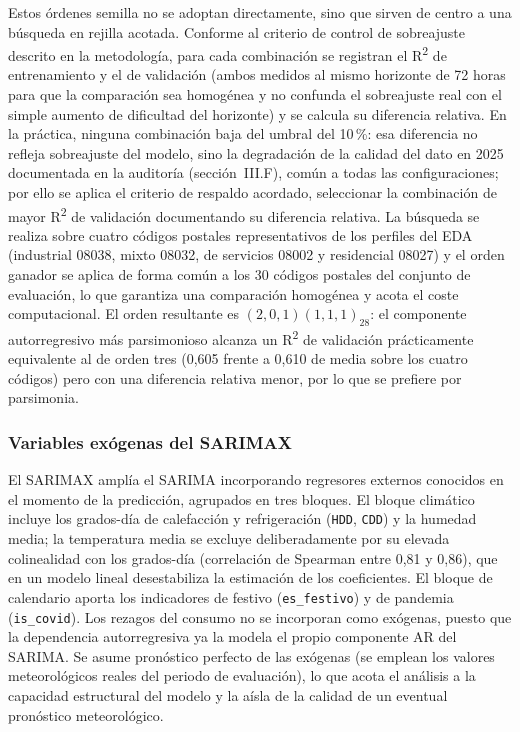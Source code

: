 \documentclass[12pt, a4paper]{article}
\begin{document}
Estos órdenes semilla no se adoptan directamente, sino que sirven de centro a una búsqueda en rejilla acotada. Conforme al criterio de control de sobreajuste descrito en la metodología, para cada combinación se registran el R\textsuperscript{2} de entrenamiento y el de validación (ambos medidos al mismo horizonte de 72 horas para que la comparación sea homogénea y no confunda el sobreajuste real con el simple aumento de dificultad del horizonte) y se calcula su diferencia relativa. En la práctica, ninguna combinación baja del umbral del 10\,\%: esa diferencia no refleja sobreajuste del modelo, sino la degradación de la calidad del dato en 2025 documentada en la auditoría (sección~III.F), común a todas las configuraciones; por ello se aplica el criterio de respaldo acordado, seleccionar la combinación de mayor R\textsuperscript{2} de validación documentando su diferencia relativa. La búsqueda se realiza sobre cuatro códigos postales representativos de los perfiles del EDA (industrial 08038, mixto 08032, de servicios 08002 y residencial 08027) y el orden ganador se aplica de forma común a los 30 códigos postales del conjunto de evaluación, lo que garantiza una comparación homogénea y acota el coste computacional. El orden resultante es $(2,0,1)(1,1,1)_{28}$: el componente autorregresivo más parsimonioso alcanza un R\textsuperscript{2} de validación prácticamente equivalente al de orden tres (0,605 frente a 0,610 de media sobre los cuatro códigos) pero con una diferencia relativa menor, por lo que se prefiere por parsimonia.

\subsubsection{Variables exógenas del SARIMAX}

El SARIMAX amplía el SARIMA incorporando regresores externos conocidos en el momento de la predicción, agrupados en tres bloques. El bloque climático incluye los grados-día de calefacción y refrigeración (\texttt{HDD}, \texttt{CDD}) y la humedad media; la temperatura media se excluye deliberadamente por su elevada colinealidad con los grados-día (correlación de Spearman entre 0,81 y 0,86), que en un modelo lineal desestabiliza la estimación de los coeficientes. El bloque de calendario aporta los indicadores de festivo (\texttt{es\_festivo}) y de pandemia (\texttt{is\_covid}). Los rezagos del consumo no se incorporan como exógenas, puesto que la dependencia autorregresiva ya la modela el propio componente AR del SARIMA. Se asume pronóstico perfecto de las exógenas (se emplean los valores meteorológicos reales del periodo de evaluación), lo que acota el análisis a la capacidad estructural del modelo y la aísla de la calidad de un eventual pronóstico meteorológico.
\end{document}
